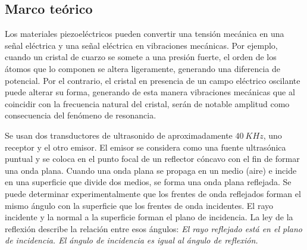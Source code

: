 \documentclass[spanish,notitlepage,letterpaper, 12pt]{article}
\begin{document}
\subsection{Marco teórico} \label{I.MT}
Los materiales piezoeléctricos pueden convertir una tensión mecánica en una señal
eléctrica y una señal eléctrica en vibraciones mecánicas. Por ejemplo, cuando un cristal de
cuarzo se somete a una presión fuerte, el orden de los átomos que lo componen se altera
ligeramente, generando una diferencia de potencial. Por el contrario, el cristal en presencia
de un campo eléctrico oscilante puede alterar su forma, generando de esta manera
vibraciones mecánicas que al coincidir con la frecuencia natural del cristal, serán de notable
amplitud como consecuencia del fenómeno de resonancia.\par
\bigskip
Se usan dos transductores de
ultrasonido de aproximadamente $40\ KHz$, uno receptor y el otro emisor. El emisor se
considera como una fuente ultrasónica puntual y se coloca en el punto focal de un reflector cóncavo con el fin de formar una onda plana. Cuando una onda plana se propaga en un
medio (aire) e incide en una superficie que divide dos medios, se forma una onda plana
reflejada. Se puede determinar experimentalmente que los frentes de onda reflejados
forman el mismo ángulo con la superficie que los frentes de onda incidentes. El rayo
incidente y la normal a la superficie forman el plano de incidencia. La ley de la reflexión
describe la relación entre esos ángulos: \textit{El rayo reflejado está en el plano de incidencia. El
ángulo de incidencia es igual al ángulo de reflexión.}\par
\shorthandoff{>}
\end{document}
